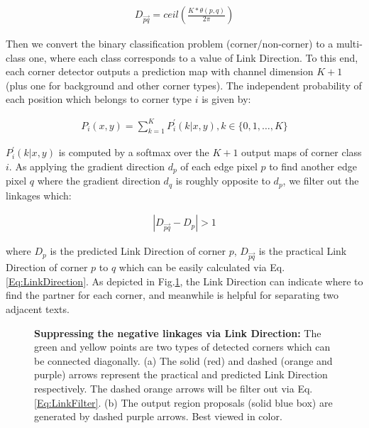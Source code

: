 \documentclass[3p, times]{elsarticle}
\begin{document}
\begin{gather}
D_{\overrightarrow{pq}}=ceil\left(\frac{K\ast\theta(p,q)}{2\pi}\right)
\label{Eq:LinkDirection}
\end{gather}

\noindent Then we convert the binary classification problem (corner/non-corner) to a multi-class one, where each class corresponds to a value of Link Direction. To this end, each corner detector outputs a prediction map with channel dimension $K+1$ (plus one for background and other corner types). The independent probability of each position which belongs to corner type $i$ is given by:

\begin{gather}
P_i(x,y)=\sum_{k=1}^{K}P^{'}_i(k|x,y), k\in\{0,1,\ldots,K\}
\label{Eq:pointscore}
\end{gather}

\noindent $P^{'}_i(k|x,y)$ is computed by a softmax over the $K+1$ output maps of corner class $i$. As \cite{SWT2010CVPR} applying the gradient direction $d_p$ of each edge pixel $p$ to find another edge pixel $q$ where the gradient direction $d_q$ is roughly opposite to $d_p$, we filter out the linkages which:

\begin{gather}
|D_{\overrightarrow{pq}}-D_p|>1
\label{Eq:LinkFilter}
\end{gather}

\noindent where $D_p$ is the predicted Link Direction of corner $p$, $D_{\overrightarrow{pq}}$ is the practical Link Direction of corner $p$ to $q$ which can be easily calculated via Eq.\ref{Eq:LinkDirection}. As depicted in Fig.\ref{Fig_2}, the Link Direction can indicate where to find the partner for each corner, and meanwhile is helpful for separating two adjacent texts.

\begin{figure}[!htb]
  \centering
  \hspace{-0.5ex}
  \caption{\textbf{Suppressing the negative linkages via Link Direction:} The green and yellow points are two types of detected corners which can be connected diagonally. (a) The solid (red) and dashed (orange and purple) arrows represent the practical and predicted Link Direction respectively. The dashed orange arrows will be filter out via Eq.\ref{Eq:LinkFilter}. (b) The output region proposals (solid blue box) are generated by dashed purple arrows. Best viewed in color.}
  \label{Fig_2} 
\end{figure}
\end{document}

